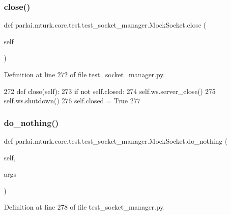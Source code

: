 \subsubsection{\texorpdfstring{close()}{close()}}
{\footnotesize\ttfamily def parlai.\+mturk.\+core.\+test.\+test\+\_\+socket\+\_\+manager.\+Mock\+Socket.\+close (\begin{DoxyParamCaption}\item[{}]{self }\end{DoxyParamCaption})}



Definition at line 272 of file test\+\_\+socket\+\_\+manager.\+py.


\begin{DoxyCode}
272     \textcolor{keyword}{def }close(self):
273         \textcolor{keywordflow}{if} \textcolor{keywordflow}{not} self.closed:
274             self.ws.server\_close()
275             self.ws.shutdown()
276             self.closed = \textcolor{keyword}{True}
277 
\end{DoxyCode}
\mbox{\label{classparlai_1_1mturk_1_1core_1_1test_1_1test__socket__manager_1_1MockSocket_ac6e66202fba2b24eddd6652e5737efbe}} 
\subsubsection{\texorpdfstring{do\+\_\+nothing()}{do\_nothing()}}
{\footnotesize\ttfamily def parlai.\+mturk.\+core.\+test.\+test\+\_\+socket\+\_\+manager.\+Mock\+Socket.\+do\+\_\+nothing (\begin{DoxyParamCaption}\item[{}]{self,  }\item[{}]{args }\end{DoxyParamCaption})}



Definition at line 278 of file test\+\_\+socket\+\_\+manager.\+py.


